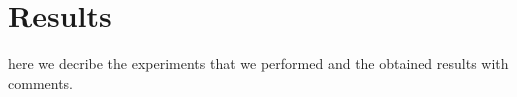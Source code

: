 \section{Results}
\label{res}

here we decribe the experiments that we performed and the obtained results with comments.

